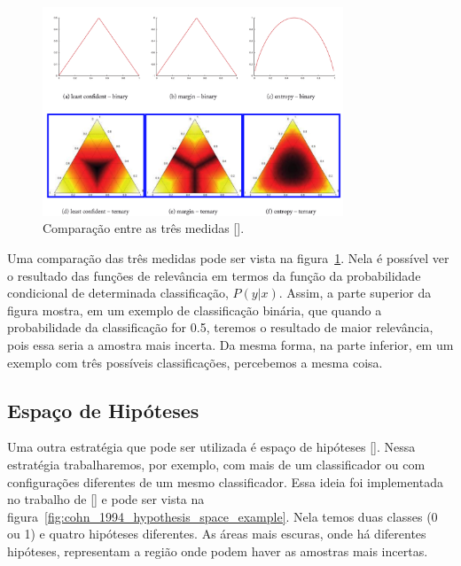 \begin{figure}
  \centering
  \includegraphics[width=0.8\textwidth]{figures/settles_2014_uncertainty_medidas.png}
  \caption{Comparação entre as três medidas [\cite{settles2014active}].}
  \label{fig:settles_2014_uncertainty_medidas}
\end{figure}



Uma comparação das três medidas pode ser vista na figura~\ref{fig:settles_2014_uncertainty_medidas}. Nela é possível ver o resultado das funções de relevância em termos da função da probabilidade condicional de determinada classificação, $P(y\lvert x)$. Assim, a parte superior da figura mostra, em um exemplo de classificação binária, que quando a probabilidade da classificação for 0.5, teremos o resultado de maior relevância, pois essa seria a amostra mais incerta. Da mesma forma, na parte inferior, em um exemplo com três possíveis classificações, percebemos a mesma coisa. 


\subsection{Espaço de Hipóteses} 
\label{sec:hypothesis_space}

Uma outra estratégia que pode ser utilizada é %
 espaço de hipóteses [\cite{mitchell1978version, mitchell1982generalization}]. Nessa estratégia trabalharemos, por exemplo, com mais de um classificador ou com configurações diferentes de um mesmo classificador.  Essa ideia foi implementada no trabalho de [\cite{atlas1990training,cohn1994improving}] e pode ser vista na figura~\ref{fig:cohn_1994_hypothesis_space_example}. Nela temos duas classes (0 ou 1) e quatro hipóteses diferentes. As áreas mais escuras, onde há %
 diferentes hipóteses, representam a região onde podem haver as amostras mais incertas. 

